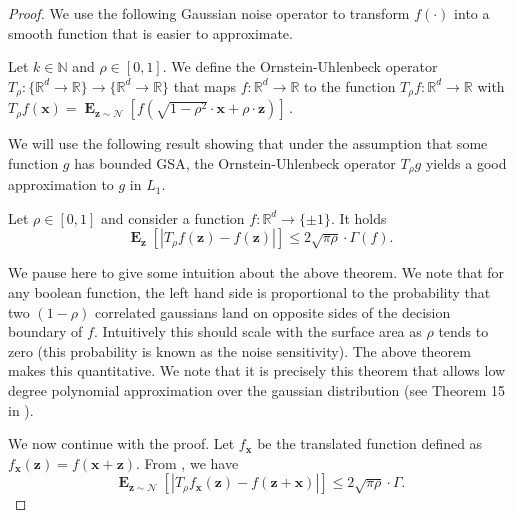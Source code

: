 \documentclass{theoretics}
\renewcommand\vec[1]{\mathbf{#1}}
\DeclareMathOperator*{\E}{\mathbf{E}}
\newcommand{\R}{\mathbb{R}}
\newcommand{\N}{\mathbb{N}}
\newcommand{\1}{\Ind}
\newcommand{\x}{\vec x}
\newcommand{\z}{\vec z}
\newcommand{\Gauss}{\mathcal{N}}
\newcommand{\ouoperator}{T}
\begin{document}
\begin{proof}
We use the following Gaussian noise operator to transform $f(\cdot)$ into a smooth function 
that is easier to approximate.
\begin{definition}\label{definition:orstein-uhlenbeck}
    Let $k\in \N$ and $\rho\in [0,1]$. 
    We define the Ornstein-Uhlenbeck operator $\ouoperator_{\rho}:\{\R^d \to\R\} \to \{\R^d \to\R\}$ that maps $f:\R^d\to\R$ to the function $\ouoperator_\rho f:\R^d \to \R$ with 
    \(
        \ouoperator_{\rho}f(\x)=\E_{\z\sim \Gauss}[f(\sqrt{1-\rho^2} \cdot \x+\rho\cdot  \z )]\,.
    \)
\end{definition}
    
    We will use the following result showing that under the assumption that 
    some function $g$ has bounded GSA, the Ornstein-Uhlenbeck operator $T_\rho g$ 
    yields a good approximation to $g$ in $L_1$.
    \begin{theorem}
    \label{prop:ou_boolean}
        Let $\rho\in [0,1]$ and consider a function $f:\R^d \to \{\pm 1\}$. It holds
       \[
       \E_\z\left[ \left| \ouoperator_\rho f(\z) - f(\z) \right| \right] \le 2\sqrt{\pi \rho} \cdot \Gamma(f).
       \]
    \end{theorem}
    We pause here to give some intuition about the above theorem. We note that for any boolean function, the left hand side is proportional to the probability that two $(1-\rho)$ correlated gaussians land on opposite sides of the decision boundary of $f$. Intuitively this should scale with the surface area as $\rho$ tends to zero (this probability is known as the noise sensitivity). The above theorem makes this quantitative. We note that it is precisely this theorem that allows low degree polynomial approximation over the gaussian distribution (see Theorem 15 in \cite{KOS:08}).

We now continue with the proof. Let $f_{\x}$ be the translated function defined as $f_{\x}(\z)=f(\x+\z)$.  
From , we have 
$$\E_{\z\sim \mathcal{N}}\left[\left|T_\rho f_{\x}(\z)-f(\z+\x)\right|\right]\leq  2\sqrt{\pi\rho}\cdot \Gamma.$$ 


\end{proof}
\end{document}

